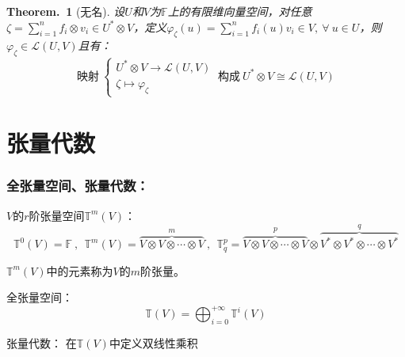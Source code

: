 \documentclass[zihao=-4,UTF8]{report}
\def\F{\mathbb{F}}
\def\T{\mathbb{T}}
\theoremstyle{mystyle} %
\newtheorem{theorem}{Theorem.\,}
\begin{document}
\begin{theorem}[无名]\label{无名}
设$U$和$V$为$\F$上的有限维向量空间，对任意$\zeta = \sum_{i=1}^{n}f_i\otimes v_i \in U^*\otimes V $，定义$\varphi_{\zeta}(u) = \sum_{i=1}^{n}f_i(u)v_i \in V,\ \forall\ u\in U$，则$\varphi_{\zeta} \in \mathscr{L}(U,V)$且有：
\begin{equation*}
    \text{映射}\ \begin{cases}
        U^*\otimes V \longrightarrow \mathscr{L}(U,V)\\
        \zeta \longmapsto \varphi_{\zeta}
    \end{cases} \ \text{构成}\ U^*\otimes V \cong \mathscr{L}(U,V)
\end{equation*}


\section{张量代数}

\end{theorem}

\subsubsection{全张量空间、张量代数：}

$V$的$r$阶张量空间$\T^m(V)$：
\begin{equation*}
    \T^0(V) = \mathbb{F}\ ,\ \  \T^m(V) = \overset{m}{\overbrace{V\otimes V \otimes \cdots \otimes V}}\ ,\ \ \T^p_q = \overset{p}{\overbrace{V\otimes V \otimes \cdots \otimes V}}\otimes \overset{q}{\overbrace{V^*\otimes V^* \otimes \cdots \otimes V^*}}
\end{equation*}
{\par\color{gray}\small
$\T^m(V)$中的元素称为$V$的$m$阶张量。
\par}

全张量空间：
\begin{equation*}
    \T(V) = \bigoplus^{+\infty}_{i=0} \T^i(V)
\end{equation*}

张量代数：
在$\T(V)$中定义双线性乘积
\end{document}
